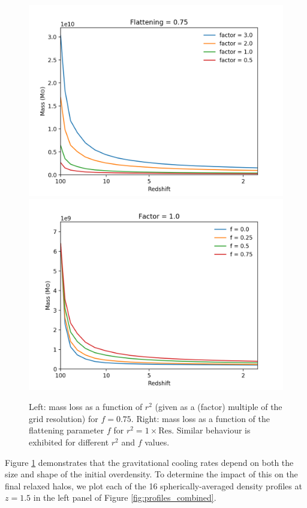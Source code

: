 \documentclass[a4paper,11pt]{article}
\begin{document}
\begin{figure}[!htb]
\centering
{}
  \includegraphics[trim={1cm 0 2cm 0.2cm},scale=0.55]{mass_loss_0_75.png}
\endminipage\hfill
{}%
  \includegraphics[trim={0.2cm 0 2cm 0.1cm},scale=0.55]{mass_loss_f_1.png}
\endminipage
\caption{Left: mass loss as a function of $r^2$ (given as a (factor) multiple of the grid resolution) for $f = 0.75$. Right: mass loss as a function of the flattening parameter $f$ for $r^2 =  1 \times \mathrm{Res}$. Similar behaviour is exhibited for different $r^2$ and $f$ values.}\label{fig:mass_loss_flat_size}
\end{figure}

Figure \ref{fig:mass_loss_flat_size} demonstrates that the gravitational cooling rates depend on both the size and shape of the initial overdensity. To determine the impact of this on the final relaxed halos, we plot each of the 16 spherically-averaged density profiles at $z=1.5$ in the left panel of Figure \ref{fig:profiles_combined}. 
\end{document}
